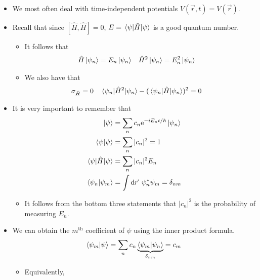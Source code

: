\documentclass[../notes.tex]{subfiles}
\begin{document}
\begin{itemize}
\begin{itemize}
\begin{itemize}
\begin{itemize}
            \end{itemize}
            \item We most often deal with time-independent potentials $V(\vec{r},t)=V(\vec{r})$.
            \item Recall that since $[\hat{H},\hat{H}]=0$, $E=\ev{\hat{H}}{\psi}$ is a good quantum number.
            \begin{itemize}
                \item It follows that
                \begin{align*}
                    \hat{H}\ket{\psi_n} &= E_n\ket{\psi_n}&
                    \hat{H}^2\ket{\psi_n} &= E_n^2\ket{\psi_n}
                \end{align*}
                \item We also have that
                \begin{align*}
                    \sigma_{\hat{H}} &= 0&
                    \ev{\hat{H}^2}{\psi_n}-(\ev{\hat{H}}{\psi_n})^2 &= 0
                \end{align*}
            \end{itemize}
            \item It is very important to remember that
            \begin{align*}
                \ket{\psi} &= \sum_nc_n\e[-iE_nt/\hbar]\ket{\psi_n}\\
                \braket{\psi} &= \sum_n|c_n|^2 = 1\\
                \ev{\hat{H}}{\psi} &= \sum_n|c_n|^2E_n\\
                \braket{\psi_n}{\psi_m} &= \int\dd{\vec{r}}\ \psi_n^*\psi_m = \delta_{nm}
            \end{align*}
            \begin{itemize}
                \item It follows from the bottom three statements that $|c_n|^2$ is the probability of measuring $E_n$.
            \end{itemize}
            \item We can obtain the $m^\text{th}$ coefficient of $\psi$ using the inner product formula.
            \begin{equation*}
                \braket{\psi_m}{\psi} = \sum_nc_n\underbrace{\braket{\psi_m}{\psi_n}}_{\delta_{nm}} = c_m
            \end{equation*}
            \begin{itemize}
                \item Equivalently,

\end{itemize}
\end{itemize}
\end{itemize}
\end{itemize}
\end{document}
